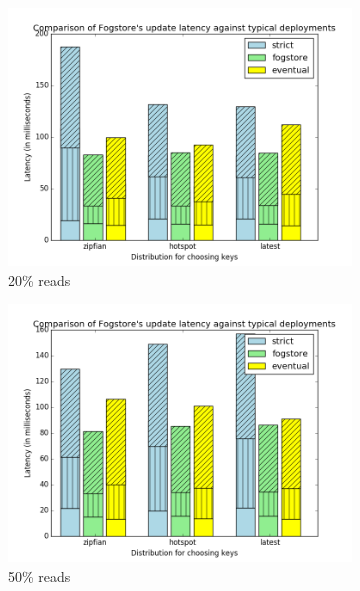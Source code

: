 \begin{figure}[t]
  \centering
  \begin{subfigure}[b]{0.32\linewidth}
    \includegraphics[width=\linewidth]{figures/fogstore/evals/stress-tests/0.2/update.png}
    \caption{20\% reads}
  \end{subfigure}
  \begin{subfigure}[b]{0.32\linewidth}
    \includegraphics[width=\linewidth]{figures/fogstore/evals/stress-tests/0.5/update.png}
    \caption{50\% reads}
  \end{subfigure}
  \begin{subfigure}[b]{0.32\linewidth}

\end{subfigure}
\end{figure}
